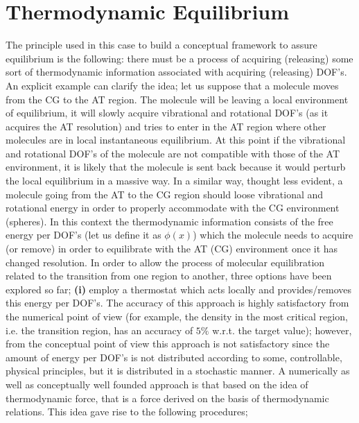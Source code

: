 \documentclass[aps,pre,preprint]{revtex4}
\begin{document}
\section{Thermodynamic Equilibrium}
The principle used in this case to build a conceptual framework to assure equilibrium is the following:  there must be a process of acquiring (releasing) some sort of thermodynamic information
  associated with acquiring (releasing) DOF's. An explicit example can clarify 
the idea; let us suppose that a molecule moves from the CG to the AT region.
The molecule will be leaving a local environment of equilibrium, it will slowly acquire vibrational and rotational DOF's (as it acquires the AT resolution) and tries to enter in the AT region where other molecules are in local instantaneous equilibrium. 
At this point if the vibrational and rotational DOF's of the molecule are not compatible with those of the AT environment, it is likely that the molecule is sent back because it would perturb the local equilibrium in a massive way. In a similar way, thought less evident, a molecule going from the AT to the CG region should loose vibrational and rotational energy in order to properly accommodate with the CG environment (spheres). In this context the thermodynamic information consists of the free energy per DOF's (let us define it as $\phi(x)$) which the molecule needs to acquire (or remove) in order to equilibrate with the AT (CG) environment once it has changed resolution. In order to allow the process of molecular equilibration related to the transition from one region to another, three options have been explored so far; {\bf (i)} employ a thermostat which acts locally and provides/removes this energy per DOF's. The accuracy of this approach is highly satisfactory  from the numerical point of view (for example, the density in the most critical region, i.e. the transition region, has an accuracy of $5\%$ w.r.t. the target value); however, from the conceptual point of view this approach is not satisfactory  since the amount of energy per DOF's is not distributed according to some, controllable, physical principles, but it is distributed in a stochastic manner. A numerically as well as conceptually well founded approach is that based on the idea of thermodynamic force, that is a force derived on the basis of thermodynamic relations. This idea gave rise to the following procedures;
\end{document}
